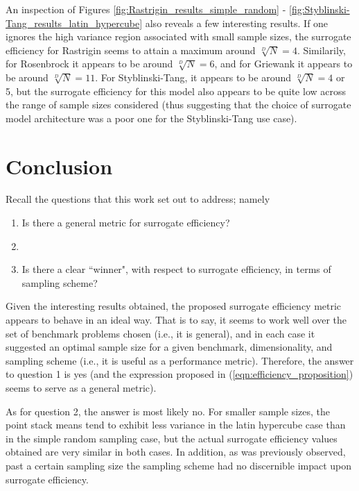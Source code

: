 \documentclass[conference]{IEEEtran}
\begin{document}
An inspection of Figures \ref{fig:Rastrigin_results_simple_random} - \ref{fig:Styblinski-Tang_results_latin_hypercube} also reveals a few interesting results. If one ignores the high variance region associated with small sample sizes, the surrogate efficiency for Rastrigin seems to attain a maximum around $\sqrt[D]{N} = 4$. Similarily, for Rosenbrock it appears to be around $\sqrt[D]{N} = 6$, and for Griewank it appears to be around $\sqrt[D]{N} = 11$. For Styblinski-Tang, it appears to be around $\sqrt[D]{N} = 4$ or 5, but the surrogate efficiency for this model also appears to be quite low across the range of sample sizes considered (thus suggesting that the choice of surrogate model architecture was a poor one for the Styblinski-Tang use case).

\section{Conclusion}

Recall the questions that this work set out to address; namely

\begin{enumerate}
	\item Is there a general metric for surrogate efficiency?
	\item []
	\item Is there a clear ``winner", with respect to surrogate efficiency, in terms of sampling scheme?
\end{enumerate}

Given the interesting results obtained, the proposed surrogate efficiency metric appears to behave in an ideal way. That is to say, it seems to work well over the set of benchmark problems chosen (i.e., it is general), and in each case it suggested an optimal sample size for a given benchmark, dimensionality, and sampling scheme (i.e., it is useful as a performance metric). Therefore, the answer to question 1 is yes (and the expression proposed in (\ref{eqn:efficiency_proposition}) seems to serve as a general metric).

As for question 2, the answer is most likely no. For smaller sample sizes, the point stack means tend to exhibit less variance in the latin hypercube case than in the simple random sampling case, but the actual surrogate efficiency values obtained are very similar in both cases. In addition, as was previously observed, past a certain sampling size the sampling scheme had no discernible impact upon surrogate efficiency.
\end{document}
